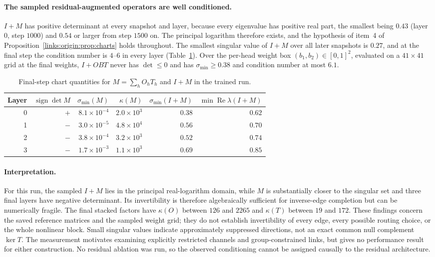 \documentclass[11pt]{article}
\theoremstyle{definition}
\theoremstyle{remark}
\begin{document}
\paragraph{The sampled residual-augmented operators are well conditioned.}
$I+M$ has positive determinant at every snapshot and layer, because every eigenvalue has positive real part, the smallest being $0.43$ (layer $0$, step $1000$) and $0.54$ or larger from step $1500$ on. The principal logarithm therefore exists, and the hypothesis of item~4 of Proposition~\ref{links:origin:prop:charts} holds throughout. The smallest singular value of $I+M$ over all later snapshots is $0.27$, and at the final step the condition number is $4$--$6$ in every layer (Table~\ref{links:origin:tab:measured}). Over the per-head weight box $(b_1,b_2)\in[0,1]^2$, evaluated on a $41\times41$ grid at the final weights, $I+OBT$ never has $\det\le0$ and has $\sigma_{\min}\ge0.38$ and condition number at most $6.1$.

\begin{table}[ht]
\centering
\small
\begin{tabular}{rrrrrr}
\toprule
Layer & $\operatorname{sign}\det M$ & $\sigma_{\min}(M)$ & $\kappa(M)$ & $\sigma_{\min}(I+M)$ & $\min\operatorname{Re}\lambda(I+M)$ \\
\midrule
0 & $+$ & $8.1\times10^{-4}$ & $2.0\times10^{3}$ & $0.38$ & $0.62$ \\
1 & $-$ & $3.0\times10^{-5}$ & $4.8\times10^{4}$ & $0.56$ & $0.70$ \\
2 & $-$ & $3.8\times10^{-4}$ & $3.2\times10^{3}$ & $0.52$ & $0.74$ \\
3 & $-$ & $1.7\times10^{-3}$ & $1.1\times10^{3}$ & $0.69$ & $0.85$ \\
\bottomrule
\end{tabular}
\caption{Final-step chart quantities for $M=\sum_hO_hT_h$ and $I+M$ in the trained run.}
\label{links:origin:tab:measured}
\end{table}

\paragraph{Interpretation.}
For this run, the sampled $I+M$ lies in the principal real-logarithm domain, while $M$ is substantially closer to the singular set and three final layers have negative determinant. Its invertibility is therefore algebraically sufficient for inverse-edge completion but can be numerically fragile. The final stacked factors have $\kappa(O)$ between $126$ and $2265$ and $\kappa(T)$ between $19$ and $172$. These findings concern the saved reference matrices and the sampled weight grid; they do not establish invertibility of every edge, every possible routing choice, or the whole nonlinear block. Small singular values indicate approximately suppressed directions, not an exact common null complement $\ker T$. The measurement motivates examining explicitly restricted channels and group-constrained links, but gives no performance result for either construction. No residual ablation was run, so the observed conditioning cannot be assigned causally to the residual architecture.
\end{document}

